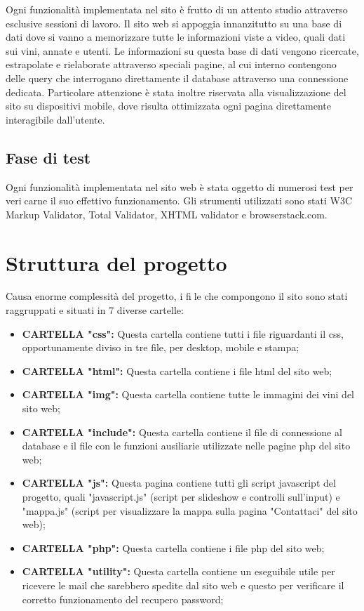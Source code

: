 Ogni funzionalità implementata nel sito è frutto di un attento studio attraverso
esclusive sessioni di lavoro.
Il sito web si appoggia innanzitutto su una base di dati dove si vanno a memorizzare 
tutte le informazioni viste a video, quali dati sui vini, annate e utenti. 
Le informazioni su questa base di dati vengono ricercate,
estrapolate e rielaborate attraverso speciali pagine, al cui interno contengono delle
query che interrogano direttamente il database attraverso una connessione dedicata.
Particolare attenzione è stata inoltre riservata alla visualizzazione del sito su
dispositivi mobile, dove risulta ottimizzata ogni pagina direttamente interagibile
dall'utente.

\subsection{Fase di test}

Ogni funzionalità implementata nel sito web è stata oggetto di numerosi test per
vericarne il suo effettivo funzionamento. Gli strumenti utilizzati sono stati W3C
Markup Validator, Total Validator, XHTML validator e browserstack.com.

\section{Struttura del progetto}

Causa enorme complessità del progetto, i file che compongono il sito sono stati
raggruppati e situati in 7 diverse cartelle:

\begin{itemize}
	\item \textbf{CARTELLA "css":} Questa cartella contiene tutti i file riguardanti il css, 
	opportunamente diviso in tre file, per desktop, mobile e stampa;
	\item \textbf{CARTELLA "html":} Questa cartella contiene i file html del sito web;
	\item \textbf{CARTELLA "img":} Questa cartella contiene tutte le immagini dei vini del sito web;
	\item \textbf{CARTELLA "include":} Questa cartella contiene il file di connessione al database e 
	il file con le funzioni ausiliarie utilizzate nelle pagine php del sito web;
	\item \textbf{CARTELLA "js":} Questa pagina contiene tutti gli script javascript
	del progetto, quali "javascript.js" (script per slideshow e controlli sull'input) e 
	"mappa.js" (script per visualizzare la mappa sulla pagina "Contattaci" del sito web);
	\item \textbf{CARTELLA "php":} Questa cartella contiene i file php del sito web;
	\item \textbf{CARTELLA "utility":} Questa cartella contiene un eseguibile utile per ricevere 
	le mail che sarebbero spedite dal sito web e questo per verificare il corretto funzionamento 
	del recupero password;
\end{itemize}

